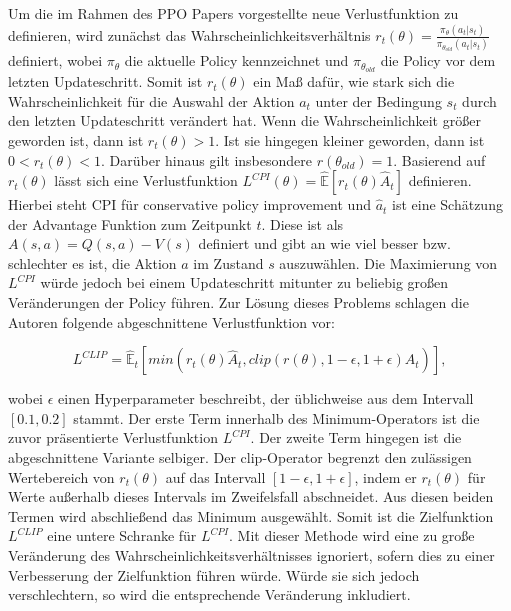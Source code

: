 Um die im Rahmen des PPO Papers vorgestellte neue Verlustfunktion zu definieren, wird zunächst das Wahrscheinlichkeitsverhältnis $r_t(\theta) = \frac{\pi_\theta(a_t|s_t)}{\pi_{\theta_{old}}(a_t|s_t)}$ definiert, wobei $\pi_\theta$ die aktuelle Policy kennzeichnet und $\pi_{\theta_{old}}$ die Policy vor dem letzten Updateschritt. Somit ist $r_t(\theta)$ ein Maß dafür, wie stark sich die Wahrscheinlichkeit für die Auswahl der Aktion $a_t$ unter der Bedingung $s_t$ durch den letzten Updateschritt verändert hat. Wenn die Wahrscheinlichkeit größer geworden ist, dann ist $r_t(\theta) > 1$. Ist sie hingegen kleiner geworden, dann ist $0 < r_t(\theta) < 1$. Darüber hinaus gilt insbesondere $r(\theta_{old}) = 1$. Basierend auf $r_t(\theta)$ lässt sich eine Verlustfunktion $L^{CPI}(\theta) = \hat{\mathbb{E}}[r_t(\theta) \hat{A}_t]$ definieren. Hierbei steht CPI für conservative policy improvement und $\hat{a}_t$ ist eine Schätzung der Advantage Funktion zum Zeitpunkt $t$. Diese ist als $A(s,a) = Q(s,a) - V(s)$ definiert und gibt an wie viel besser bzw. schlechter es ist, die Aktion $a$ im Zustand $s$ auszuwählen. Die Maximierung von $L^{CPI}$ würde jedoch bei einem Updateschritt mitunter zu beliebig großen Veränderungen der Policy führen. Zur Lösung dieses Problems schlagen die Autoren folgende abgeschnittene Verlustfunktion vor:

\begin{equation}
  \label{L_CLIP}
	L^{CLIP} = \hat{\mathbb{E}}_t[min(r_t(\theta) \hat{A}_t, clip(r(\theta), 1-\epsilon, 1+\epsilon) \hat{A}_t)],
\end{equation}

wobei $\epsilon$ einen Hyperparameter beschreibt, der üblichweise aus dem Intervall $[0.1, 0.2]$ stammt. Der erste Term innerhalb des Minimum-Operators ist die zuvor präsentierte Verlustfunktion $L^{CPI}$. Der zweite Term hingegen ist die abgeschnittene Variante selbiger. Der clip-Operator begrenzt den zulässigen Wertebereich von $r_t(\theta)$ auf das Intervall $[1-\epsilon, 1+\epsilon]$, indem er $r_t(\theta)$ für Werte außerhalb dieses Intervals im Zweifelsfall abschneidet. Aus diesen beiden Termen wird abschließend das Minimum ausgewählt. Somit ist die Zielfunktion $L^{CLIP}$ eine untere Schranke für $L^{CPI}$. Mit dieser Methode wird eine zu große Veränderung des Wahrscheinlichkeitsverhältnisses ignoriert, sofern dies zu einer Verbesserung der Zielfunktion führen würde. Würde sie sich jedoch verschlechtern, so wird die entsprechende Veränderung inkludiert.

